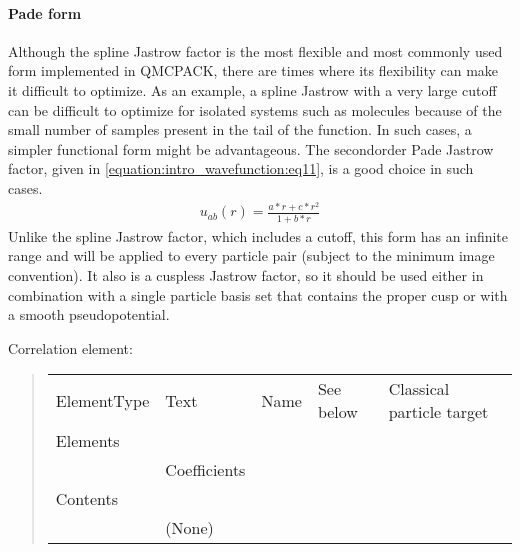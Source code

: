 \documentclass[letterpaper,10pt,english]{sphinxmanual}
\begin{document}
\paragraph{Pade form}
\label{\detokenize{intro_wavefunction:pade-form}}\label{\detokenize{intro_wavefunction:onebodyjastrowpade}}
Although the spline Jastrow factor is the most flexible and most commonly used form implemented in QMCPACK,
there are times where its flexibility can make it difficult to optimize.  As an example, a spline Jastrow
with a very large cutoff can be difficult to optimize for isolated systems such as molecules because of the small
number of samples present in the tail of the function.  In such cases, a simpler functional
form might be advantageous.  The second\sphinxhyphen{}order Pade Jastrow factor, given in \eqref{equation:intro_wavefunction:eq11}, is a good choice
in such cases.
\begin{equation}\label{equation:intro_wavefunction:eq11}
\begin{split}u_{ab}(r) = \frac{a*r+c*r^2}{1+b*r}\end{split}
\end{equation}
Unlike the spline Jastrow factor, which includes a cutoff, this form has an infinite range and will be applied to every particle
pair (subject to the minimum image convention).  It also is a cuspless Jastrow factor,
so it should be used either in combination with a single particle basis set that contains the proper cusp or
with a smooth pseudopotential.

Correlation element:
\begin{quote}


\begin{savenotes}\sphinxattablestart
\centering
\begin{tabulary}{\linewidth}[t]{|T|T|T|T|T|}
\hline

&
&
&
&
\\
\hline
ElementType
&
Text
&
Name
&
See below
&
Classical particle target
\\
\hline
Elements
&&&&\\
\hline&
Coefficients
&&&\\
\hline
Contents
&&&&\\
\hline&
(None)
&&&\\
\hline
\end{tabulary}
\par
\sphinxattableend\end{savenotes}
\end{quote}
\end{document}

